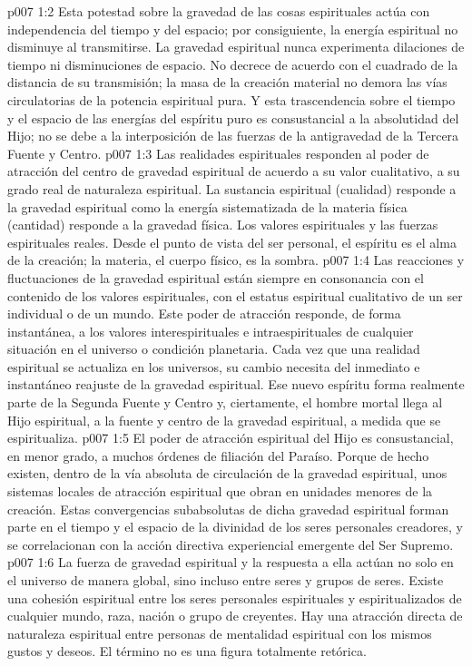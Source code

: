 \vs p007 1:2 Esta potestad sobre la gravedad de las cosas espirituales actúa con independencia del tiempo y del espacio; por consiguiente, la energía espiritual no disminuye al transmitirse. La gravedad espiritual nunca experimenta dilaciones de tiempo ni disminuciones de espacio. No decrece de acuerdo con el cuadrado de la distancia de su transmisión; la masa de la creación material no demora las vías circulatorias de la potencia espiritual pura. Y esta trascendencia sobre el tiempo y el espacio de las energías del espíritu puro es consustancial a la absolutidad del Hijo; no se debe a la interposición de las fuerzas de la antigravedad de la Tercera Fuente y Centro.
\vs p007 1:3 Las realidades espirituales responden al poder de atracción del centro de gravedad espiritual de acuerdo a su valor cualitativo, a su grado real de naturaleza espiritual. La sustancia espiritual (cualidad) responde a la gravedad espiritual como la energía sistematizada de la materia física (cantidad) responde a la gravedad física. Los valores espirituales y las fuerzas espirituales  reales. Desde el punto de vista del ser personal, el espíritu es el alma de la creación; la materia, el cuerpo físico, es la sombra.
\vs p007 1:4 Las reacciones y fluctuaciones de la gravedad espiritual están siempre en consonancia con el contenido de los valores espirituales, con el estatus espiritual cualitativo de un ser individual o de un mundo. Este poder de atracción responde, de forma instantánea, a los valores interespirituales e intraespirituales de cualquier situación en el universo o condición planetaria. Cada vez que una realidad espiritual se actualiza en los universos, su cambio necesita del inmediato e instantáneo reajuste de la gravedad espiritual. Ese nuevo espíritu forma realmente parte de la Segunda Fuente y Centro y, ciertamente, el hombre mortal llega al Hijo espiritual, a la fuente y centro de la gravedad espiritual, a medida que se espiritualiza.
\vs p007 1:5 \pc El poder de atracción espiritual del Hijo es consustancial, en menor grado, a muchos órdenes de filiación del Paraíso. Porque de hecho existen, dentro de la vía absoluta de circulación de la gravedad espiritual, unos sistemas locales de atracción espiritual que obran en unidades menores de la creación. Estas convergencias subabsolutas de dicha gravedad espiritual forman parte en el tiempo y el espacio de la divinidad de los seres personales creadores, y se correlacionan con la acción directiva experiencial emergente del Ser Supremo.
\vs p007 1:6 La fuerza de gravedad espiritual y la respuesta a ella actúan no solo en el universo de manera global, sino incluso entre seres y grupos de seres. Existe una cohesión espiritual entre los seres personales espirituales y espiritualizados de cualquier mundo, raza, nación o grupo de creyentes. Hay una atracción directa de naturaleza espiritual entre personas de mentalidad espiritual con los mismos gustos y deseos. El término  no es una figura totalmente retórica.
